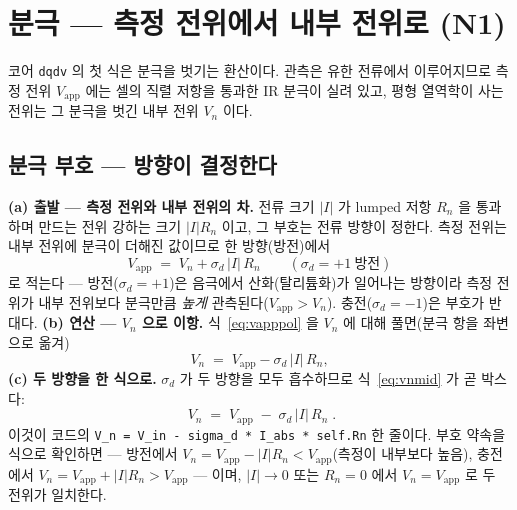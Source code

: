 \documentclass[11pt,a4paper]{article}
\newcommand{\app}{\mathrm{app}}
\newcommand{\code}[1]{\texttt{#1}}
\begin{document}
\section{분극 — 측정 전위에서 내부 전위로 (N1)}\label{sec:pol}
코어 \code{dqdv} 의 첫 식은 분극을 벗기는 환산이다. 관측은 유한 전류에서 이루어지므로 측정 전위 $V_\app$ 에는 셀의
직렬 저항을 통과한 IR 분극이 실려 있고, 평형 열역학이 사는 전위는 그 분극을 벗긴 내부 전위 $V_n$ 이다.

\subsection{분극 부호 — 방향이 결정한다}
\textbf{(a) 출발 — 측정 전위와 내부 전위의 차.} 전류 크기 $|I|$ 가 lumped 저항 $R_n$ 을 통과하며 만드는 전위 강하는
크기 $|I|R_n$ 이고, 그 부호는 전류 방향이 정한다. 측정 전위는 내부 전위에 분극이 더해진 값이므로 한 방향(방전)에서
\begin{equation}
V_\app\;=\;V_n+\sigma_d\,|I|\,R_n
\qquad(\sigma_d=+1\ \text{방전})
\label{eq:vapppol}
\end{equation}
로 적는다 — 방전($\sigma_d=+1$)은 음극에서 산화(탈리튬화)가 일어나는 방향이라 측정 전위가 내부 전위보다 분극만큼
\emph{높게} 관측된다($V_\app>V_n$). 충전($\sigma_d=-1$)은 부호가 반대다. \textbf{(b) 연산 — $V_n$ 으로 이항.}
식~\eqref{eq:vapppol} 을 $V_n$ 에 대해 풀면(분극 항을 좌변으로 옮겨)
\begin{equation}
V_n\;=\;V_\app-\sigma_d\,|I|\,R_n,
\label{eq:vnmid}
\end{equation}
\textbf{(c) 두 방향을 한 식으로.} $\sigma_d$ 가 두 방향을 모두 흡수하므로 식~\eqref{eq:vnmid} 가 곧 박스다:
\begin{equation}
\boxed{\;V_n\;=\;V_\app\;-\;\sigma_d\,|I|\,R_n\;.}
\label{eq:vn}
\end{equation}
이것이 코드의 \code{V\_n = V\_in - sigma\_d * I\_abs * self.Rn} 한 줄이다. 부호 약속을 식으로 확인하면 —
방전에서 $V_n=V_\app-|I|R_n<V_\app$(측정이 내부보다 높음), 충전에서 $V_n=V_\app+|I|R_n>V_\app$ — 이며,
$|I|\to0$ 또는 $R_n=0$ 에서 $V_n=V_\app$ 로 두 전위가 일치한다.
\end{document}
